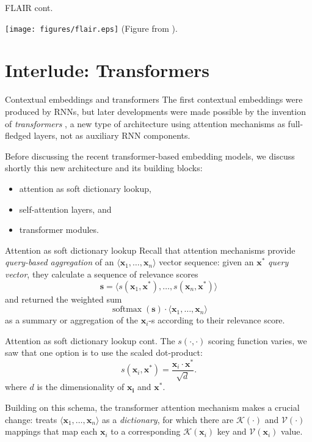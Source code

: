 \documentclass[style=upen, size=14pt]{powerdot}
\DeclareMathOperator*{\softmax}{softmax}
\newcommand{\gold}{\color{arany}}
\theoremstyle{definition}
\begin{document}
\begin{slide}[toc=]{FLAIR cont.}
  \begin{center}
    \texttt{[image: figures/flair.eps]}
    \footnotesize{(Figure from \cite{akbik2018contextual}).}
  \end{center}
\end{slide}

\section[toc=Transformers]{Interlude: Transformers}

\begin{slide}[toc=Introduction]{Contextual embeddings and transformers}
  The first contextual embeddings were produced by RNNs, but later developments
  were made possible by the invention of \emph{\gold transformers}
  \citep{vaswani2017attention}, a new type of architecture using attention
  mechanisms as full-fledged layers, not as auxiliary RNN components.\bigskip

  Before discussing the recent transformer-based embedding models, we discuss
  shortly this new architecture and its building blocks:
  \begin{itemize}
  \item attention as soft dictionary lookup,
  \item self-attention layers, and
  \item transformer modules.
  \end{itemize}
\end{slide}

\begin{slide}[toc=KV-attention]{Attention as soft dictionary lookup}
  Recall that attention mechanisms provide \emph{query-based aggregation} of an
  $\langle \mathbf{x}_1,\dots, \mathbf{x}_n\rangle $ vector sequence: given an
  $\mathbf{x^*}$ \emph{query vector}, they calculate a sequence of relevance
  scores
  $$
  \mathbf{s} = \langle s(\mathbf{x}_1, \mathbf{x}^*),\dots, s(\mathbf{x}_n,
  \mathbf{x}^*) \rangle
  $$
  and returned the weighted sum 
  $$
  \softmax (\mathbf{s})\cdot \langle \mathbf{x}_1,\dots, \mathbf{x}_n\rangle 
  $$
  as a summary or aggregation of the $\mathbf{x}_i$-s according to their
  relevance score.
\end{slide}

\begin{slide}[toc=]{Attention as soft dictionary lookup cont.}
  The $s(\cdot, \cdot)$ scoring function varies, we saw that one option is to
  use the scaled dot-product:
  $$
  s(\mathbf{x}_i, \mathbf{x}^*) = \frac{\mathbf{x}_i\cdot
    \mathbf{x}^*}{\sqrt{d}}.
  $$
  where $d$ is the dimensionality of $\mathbf{x_i}$ and $\mathbf{x^*}$.\bigskip

  Building on this schema, the transformer attention mechanism makes a crucial
  change: treats $\langle \mathbf{x}_1,\dots, \mathbf{x}_n\rangle$ as a
  \emph{\gold dictionary}, for which there are $\mathcal K(\cdot)$ and $\mathcal V(\cdot)$
  mappings that map each $\mathbf{x}_i$ to a corresponding
  $\mathcal K(\mathbf{x}_i)$ key and $\mathcal V(\mathbf{x}_i)$ value.
\end{slide}
\end{document}
